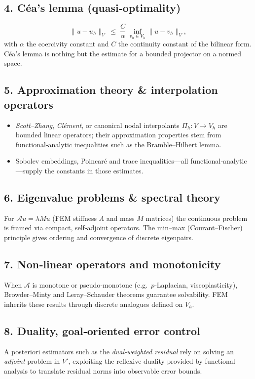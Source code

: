 \documentclass[12pt]{article}
\theoremstyle{definition} %
\theoremstyle{plain} %
\begin{document}
\subsection*{4.  Céa’s lemma (quasi‑optimality)}
\[
	\|u-u_h\|_V \;\le\; \frac{C}{\alpha}\;
	\inf_{v_h\in V_h}\|u-v_h\|_V ,
\]
with $\alpha$ the coercivity constant and $C$ the continuity constant of
the bilinear form.  
Céa’s lemma is nothing but the estimate for a bounded projector on a
normed space.

\subsection*{5.  Approximation theory \& interpolation operators}
\begin{itemize}
  \item \emph{Scott–Zhang}, \emph{Clément}, or canonical nodal
        interpolants $\Pi_h:V\to V_h$ are bounded linear operators;
        their approximation properties stem from functional‑analytic
        inequalities such as the Bramble–Hilbert lemma.
  \item Sobolev embeddings, Poincaré and trace inequalities—all
        functional‑analytic—supply the constants in those estimates.
\end{itemize}

\subsection*{6.  Eigenvalue problems \& spectral theory}
For
\(
	\mathcal{A}u = \lambda Mu
\)
(FEM stiffness $A$ and mass $M$ matrices) the continuous problem is
framed via compact, self‑adjoint operators.  
The min–max (Courant–Fischer) principle gives ordering and
convergence of discrete eigenpairs.

\subsection*{7.  Non‑linear operators and monotonicity}
When $\mathcal{A}$ is monotone or pseudo‑monotone (e.g.\ $p$‑Laplacian,
viscoplasticity), Browder–Minty and Leray–Schauder theorems guarantee
solvability.  
FEM inherits these results through discrete analogues defined on $V_h$.

\subsection*{8.  Duality, goal‑oriented error control}
A posteriori estimators such as the \emph{dual‑weighted residual} rely
on solving an \emph{adjoint} problem in $V'$, exploiting the reflexive
duality provided by functional analysis to translate residual norms
into observable error bounds.
\end{document}
